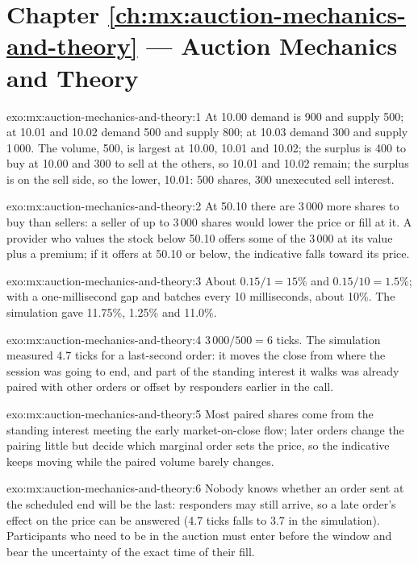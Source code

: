 \section*{Chapter \ref{ch:mx:auction-mechanics-and-theory} --- Auction Mechanics and Theory}

\begin{solution}{exo:mx:auction-mechanics-and-theory:1}
At 10.00 demand is 900 and supply 500; at 10.01 and 10.02 demand 500 and supply 800; at 10.03 demand 300 and supply 1\,000. The volume, 500, is largest at
10.00, 10.01 and 10.02; the surplus is 400 to buy at 10.00 and 300 to sell at the others, so 10.01 and 10.02 remain; the surplus is on the sell side, so the
lower, 10.01: 500 shares, 300 unexecuted sell interest.
\end{solution}

\begin{solution}{exo:mx:auction-mechanics-and-theory:2}
At 50.10 there are 3\,000 more shares to buy than sellers: a seller of up to 3\,000 shares would lower the price or fill at it. A provider who values the stock
below 50.10 offers some of the 3\,000 at its value plus a premium; if it offers at 50.10 or below, the indicative falls toward its price.
\end{solution}

\begin{solution}{exo:mx:auction-mechanics-and-theory:3}
About $0.15/1=15\%$ and $0.15/10=1.5\%$; with a one-millisecond gap and batches every 10 milliseconds, about 10\%. The simulation gave 11.75\%, 1.25\% and 11.0\%.
\end{solution}

\begin{solution}{exo:mx:auction-mechanics-and-theory:4}
$3\,000/500=6$ ticks. The simulation measured 4.7 ticks for a last-second order: it moves the close from where the session was going to end, and part of
the standing interest it walks was already paired with other orders or offset by responders earlier in the call.
\end{solution}

\begin{solution}{exo:mx:auction-mechanics-and-theory:5}
Most paired shares come from the standing interest meeting the early market-on-close flow; later orders change the pairing little but decide which
marginal order sets the price, so the indicative keeps moving while the paired volume barely changes.
\end{solution}

\begin{solution}{exo:mx:auction-mechanics-and-theory:6}
Nobody knows whether an order sent at the scheduled end will be the last: responders may still arrive, so a late order's effect on the price can be
answered (4.7 ticks falls to 3.7 in the simulation). Participants who need to be in the auction must enter before the window and bear the uncertainty of
the exact time of their fill.
\end{solution}


